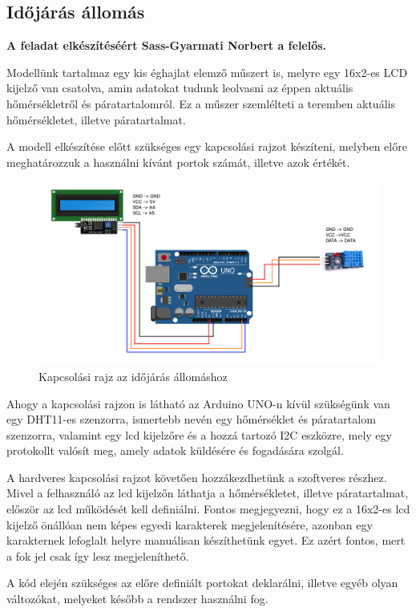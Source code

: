 \documentclass[
]{thesis-ekf}
\theoremstyle{definition}
\theoremstyle{remark}
\begin{document}
		\subsection{Időjárás állomás}
			\textbf{A feladat elkészítéséért Sass-Gyarmati Norbert a felelős.} 
			\par Modellünk tartalmaz egy kis éghajlat elemző műszert is, melyre egy 16x2-es LCD kijelző van csatolva, amin adatokat tudunk leolvasni az éppen aktuális hőmérsékletről és páratartalomról. Ez a műszer szemlélteti a teremben aktuális hőmérsékletet, illetve páratartalmat.
			\par A modell elkészítése előtt szükséges egy kapcsolási rajzot készíteni, melyben előre meghatározzuk a használni kívánt portok számát, illetve azok értékét. 
				\begin{figure}[H]
				\centering
				\includegraphics[scale=0.30]{./images/TemperatureAndHumidity}
				\caption{Kapcsolási rajz az időjárás állomáshoz}
			\end{figure}
			\par Ahogy a kapcsolási rajzon is látható az Arduino UNO-n kívül szükségünk van egy DHT11-es szenzorra, ismertebb nevén egy hőmérséklet és páratartalom szenzorra, valamint egy lcd kijelzőre és a hozzá tartozó I2C eszközre, mely egy protokollt valósít meg, amely adatok küldésére és fogadására szolgál.
			\par A hardveres kapcsolási rajzot követően hozzákezdhetünk a szoftveres részhez. Mivel a felhasználó az lcd kijelzőn láthatja a hőmérsékletet, illetve páratartalmat, először az lcd működését kell definiálni. Fontos megjegyezni, hogy ez a 16x2-es lcd kijelző önállóan nem képes egyedi karakterek megjelenítésére, azonban egy karakternek lefoglalt helyre manuálisan készíthetünk egyet. Ez azért fontos, mert a fok jel csak így lesz megjeleníthető.
			\par A kód elején szükséges az előre definiált portokat deklarálni, illetve egyéb olyan változókat, melyeket később a rendszer használni fog.
\end{document}
